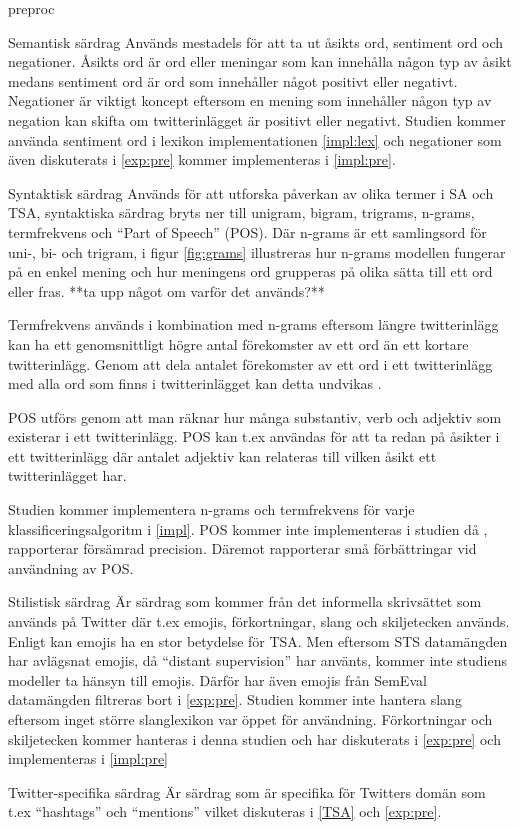 \documentclass{kaumasters} %
\begin{document}
\begin{labeling}{preproc}
\item [Semantisk särdrag]
Används mestadels för att ta ut  åsikts ord, sentiment ord och negationer. Åsikts ord är ord eller meningar som kan innehålla någon typ av åsikt medans sentiment ord är ord som innehåller något positivt eller negativt. Negationer är viktigt koncept eftersom en mening som innehåller någon typ av negation kan skifta om twitterinlägget är positivt eller negativt. Studien kommer använda sentiment ord i lexikon implementationen \ref{impl:lex} och negationer som även diskuterats i \ref{exp:pre} kommer implementeras i \ref{impl:pre}.

\item [Syntaktisk särdrag]
Används för att utforska påverkan av olika termer i SA och TSA, syntaktiska särdrag bryts ner till unigram, bigram, trigrams, n-grams, termfrekvens och “Part of Speech” (POS). Där n-grams är ett samlingsord för uni-, bi- och trigram, i figur \ref{fig:grams} illustreras hur n-grams modellen fungerar på en enkel mening och hur meningens ord grupperas på olika sätta till ett ord eller fras. **ta upp något om varför det används?**

Termfrekvens används i kombination med n-grams eftersom längre twitterinlägg kan ha ett genomsnittligt högre antal förekomster av ett ord än ett kortare twitterinlägg. Genom att dela antalet förekomster av ett ord i ett twitterinlägg med alla ord som finns i twitterinlägget kan detta undvikas \cite{scikit:001}.

POS utförs genom att man räknar hur många substantiv, verb och adjektiv som existerar i ett twitterinlägg. POS kan t.ex användas för att ta redan på åsikter i ett twitterinlägg där antalet adjektiv kan relateras till vilken åsikt ett twitterinlägget har.

Studien kommer implementera n-grams och termfrekvens för varje klassificeringsalgoritm i \ref{impl}. POS kommer inte implementeras i studien då \cite{go2009twitter}, \cite{feature:001} rapporterar försämrad precision. Däremot rapporterar \cite{feature:002} små förbättringar vid användning av POS.
\item [Stilistisk särdrag]
Är särdrag som kommer från det informella skrivsättet som används på Twitter där t.ex emojis, förkortningar, slang och skiljetecken används. Enligt \cite{feature:002} kan emojis ha en stor betydelse för TSA. Men eftersom STS datamängden har avlägsnat emojis, då “distant supervision” \cite{sts:001} har använts, kommer inte studiens modeller ta hänsyn till emojis. Därför har även emojis från SemEval datamängden filtreras bort i \ref{exp:pre}. Studien kommer inte hantera slang eftersom inget större slanglexikon var öppet för användning. 
Förkortningar och skiljetecken kommer hanteras i denna studien och har diskuterats i \ref{exp:pre} och implementeras i \ref{impl:pre}
\item [Twitter-specifika särdrag] 
Är särdrag som är specifika för Twitters domän som t.ex “hashtags” och “mentions” vilket diskuteras i \ref{TSA} och \ref{exp:pre}.
\end{labeling}
\end{document}
